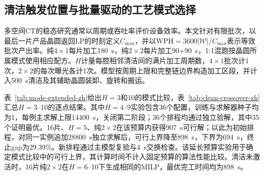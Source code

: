 \documentclass[final,5p,times,twocolumn]{elsarticle}
\begin{document}
\subsection{清洁触发位置与批量驱动的工艺模式选择}

多空间CT的稳态研究通常以周期或吞吐率评价设备效率\citep{gu2024multifinger}。本文针对有限批次，以最后一片产品晶圆返回LP的时刻定义$C_{\max}$，并以$\mathrm{WPH}=3600|\mathcal W|/C_{\max}$表示等效批次产出率。纯$4\times1$每片加工180~s，纯$2\times2$每片加工90+90~s，1:1混跑按晶圆所属模式使用相应配方。$H$计量每腔相邻清洁间的满片加工周期数，$4\times1$批次计1次，$2\times2$的每次曝光各计1次。模型按周期上限和完整链边界构造加工区段，并计入500~s清洁及其辅助晶圆装卸、旋转和搬运。

表~\ref{tab:mode-extended-zh}给出$H=3$和10的模式比较，表~\ref{tab:clean-crossover-zh}汇总$H=3$--10的逐点结果。其中$H=4$--9实验包含36个配置，训练与求解器种子均为1，每例主求解上限14400~s，关闭第二阶段；36个排程均通过独立验解，其中35个证明最优。16片、$H=5$、纯$2\times2$在该预算内获得907~s可行解；以此为初始排程，对同一实例追加28800~s独立求解后，可行上界降至898~s，下界为694~s，终止gap为29.39\%。新排程通过主模型复验与4~s交换检查。该延长预算实验用于确定模式比较中的可行上界，其计算时间不计入固定预算的算法性能比较。清洁未激活时，16片纯$2\times2$在$H=6$--10下生成相同的MILP，最优完工时间均为898~s。
\end{document}
